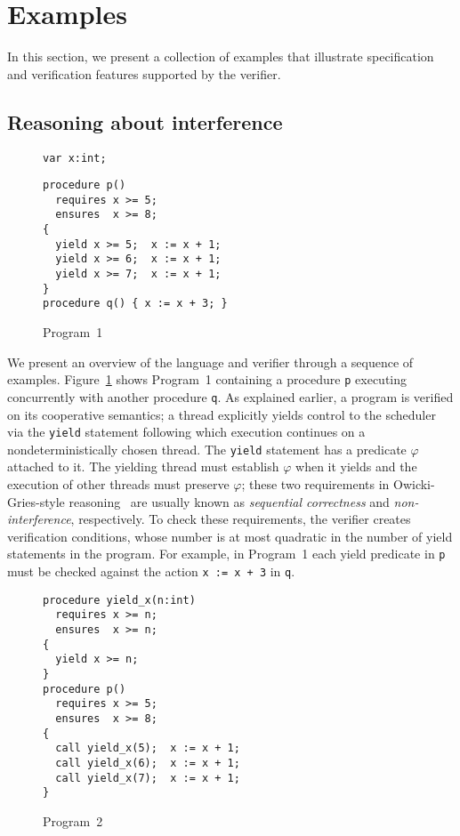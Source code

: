 \section{Examples}
\label{sec:examples}

In this section, we present a collection of examples that illustrate
specification and verification features supported by the \civl verifier.
\subsection{Reasoning about interference}
\label{sec:examples-interference}
\begin{figure}
\begin{verbatim}
var x:int;
\end{verbatim}
\begin{verbatim}
procedure p()
  requires x >= 5;
  ensures  x >= 8;
{
  yield x >= 5;  x := x + 1;
  yield x >= 6;  x := x + 1;
  yield x >= 7;  x := x + 1;
}
procedure q() { x := x + 3; }
\end{verbatim}
\caption{Program~1}
\label{fig:ex1}
\end{figure}

We present an overview of the \civl language and verifier through a sequence of examples.
Figure~\ref{fig:ex1} shows Program~1 containing a procedure {\tt p}
executing concurrently with another procedure {\tt q}. 
As explained earlier, a \civl program is verified on its cooperative semantics; a thread explicitly yields control to the
scheduler via the {\tt yield} statement following which execution continues on a 
nondeterministically chosen thread.
The {\tt yield} statement has a predicate $\varphi$ attached to it.
The yielding thread must establish $\varphi$ when it yields and the execution of other threads 
must preserve $\varphi$; these two requirements in Owicki-Gries-style
reasoning~\cite{OwickiG76} are usually known as {\em sequential correctness}
and {\em non-interference}, respectively.
To check these requirements, the \civl verifier creates verification conditions, whose number is at most
quadratic in the number of yield statements in the program.
For example, in Program~1 each yield predicate in {\tt p} must be checked against the action 
{\tt x := x + 3} in {\tt q}.

\begin{figure}
\begin{verbatim}
procedure yield_x(n:int)
  requires x >= n;
  ensures  x >= n;
{
  yield x >= n;
}
procedure p()
  requires x >= 5;
  ensures  x >= 8;
{
  call yield_x(5);  x := x + 1;
  call yield_x(6);  x := x + 1;
  call yield_x(7);  x := x + 1;
}
\end{verbatim}
\caption{Program~2}
\label{fig:ex2}
\end{figure}

